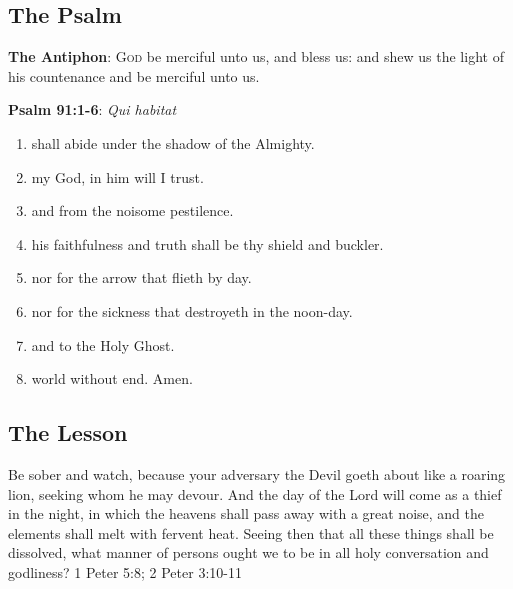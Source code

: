 \documentclass{article}
\begin{document}
\subsection*{The Psalm}


\textbf{The Antiphon}: \textsc{God} be merciful unto us, and bless
us: and shew us the light
of his countenance and be merciful unto us.

\textbf{Psalm 91:1-6}: \textit{Qui habitat}


\begin{enumerate}[
      leftmargin=*,
      label=\textsc {\arabic *}
    ]
  \item {}
    {shall abide under the shadow of the Almighty.}
  \item {} {my God, in him will I trust.}
  \item {} {and from the noisome pestilence.}
  \item {} {his faithfulness and truth
    shall be thy shield and buckler.}
  \item {} {nor for the arrow that flieth by day.}
  \item {}
    {nor for the sickness that destroyeth in the noon-day.}
  \item[] 
    {and to the Holy Ghost.}
  \item[] 
    {world without end. Amen.}
\end{enumerate}

\subsection*{The Lesson}


\bibleverse
{Be sober and watch, because your adversary the Devil goeth about
like a roaring lion, seeking whom he may devour. And the day of the Lord
will come as a thief in the night, in which the heavens shall pass away
with a great noise, and the elements shall melt with fervent heat. Seeing
then that all these things shall be dissolved, what manner of persons
ought we to be in all holy conversation and godliness?}
{1 Peter 5:8; 2 Peter 3:10-11}
\end{document}
